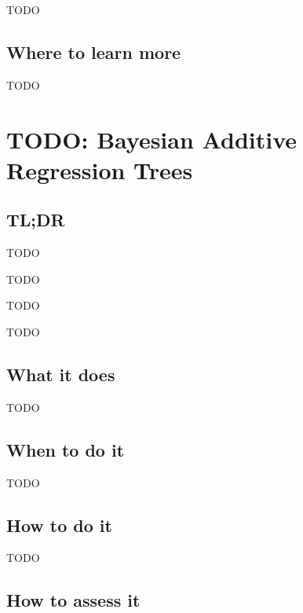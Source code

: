 \documentclass[
]{book}
\providecommand{\tightlist}{%
  \setlength{\itemsep}{0pt}\setlength{\parskip}{0pt}}
\begin{document}
TODO

\hypertarget{where-to-learn-more-18}{%
\section{Where to learn more}\label{where-to-learn-more-18}}

TODO

\hypertarget{bayesian-additive-regression-trees}{%
\chapter{TODO: Bayesian Additive Regression Trees}\label{bayesian-additive-regression-trees}}

\hypertarget{tldr-19}{%
\section{TL;DR}\label{tldr-19}}

\begin{description}
\tightlist
\item[What it does]
TODO
\item[When to do it]
TODO
\item[How to do it]
TODO
\item[How to assess it]
TODO
\end{description}

\hypertarget{what-it-does-19}{%
\section{What it does}\label{what-it-does-19}}

TODO

\hypertarget{when-to-do-it-19}{%
\section{When to do it}\label{when-to-do-it-19}}

TODO

\hypertarget{how-to-do-it-19}{%
\section{How to do it}\label{how-to-do-it-19}}

TODO

\hypertarget{how-to-assess-it-19}{%
\section{How to assess it}\label{how-to-assess-it-19}}
\end{document}
